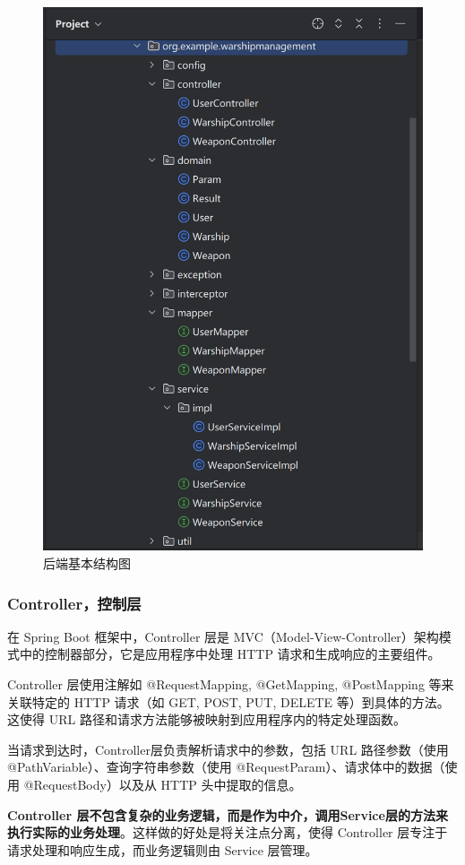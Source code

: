 \documentclass{base}
\begin{document}
\begin{figure}[H]
	\centering
	\includegraphics[width=0.7\linewidth]{images/BackEndProjectStructure}
	\caption{后端基本结构图}
	\label{fig:backendprojectstructure}
\end{figure}


\subsubsection{Controller，控制层}

在 Spring Boot 框架中，Controller 层是 MVC（Model-View-Controller）架构模式中的控制器部分，它是应用程序中处理 HTTP 请求和生成响应的主要组件。

Controller 层使用注解如 @RequestMapping, @GetMapping, @PostMapping 等来关联特定的 HTTP 请求（如 GET, POST, PUT, DELETE 等）到具体的方法。这使得 URL 路径和请求方法能够被映射到应用程序内的特定处理函数。

当请求到达时，Controller层负责解析请求中的参数，包括 URL 路径参数（使用 @PathVariable）、查询字符串参数（使用 @RequestParam）、请求体中的数据（使用 @RequestBody）以及从 HTTP 头中提取的信息。

\textbf{Controller 层不包含复杂的业务逻辑，而是作为中介，调用Service层的方法来执行实际的业务处理}。这样做的好处是将关注点分离，使得 Controller 层专注于请求处理和响应生成，而业务逻辑则由 Service 层管理。
\end{document}
